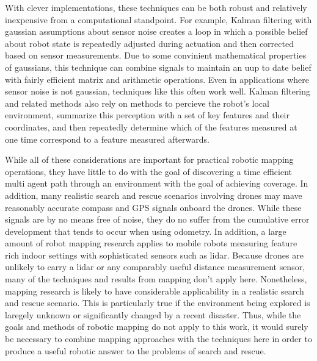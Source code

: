 With clever implementations, these techniques can be both robust and relatively inexpensive from a computational standpoint. For example, Kalman filtering with gaussian assumptions about sensor noise creates a loop in which a possible belief about robot state is repeatedly adjusted during actuation and then corrected based on sensor measurements. Due to some convinient mathematical properties of gaussians, this technique can combine signals to maintain an uup to date belief with fairly efficient matrix and arithmetic operations. Even in applications where sensor noise is not gaussian, techniques like this often work well. Kalman filtering and related methods also rely on methods to percieve the robot's local environment, summarize this perception with a set of key features and their coordinates, and then repeatedly determine which of the features measured at one time correspond to a feature measured afterwards.

While all of these considerations are important for practical robotic mapping operations, they have little to do with the goal of discovering a time efficient multi agent path through an environment with the goal of achieving coverage. In addition, many realistic search and rescue scenarios involving drones may mave reasonably accurate compass and GPS signals onboard the drones. While these signals are by no means free of noise, they do no suffer from the cumulative error development that tends to occur when using odometry. In addition, a large amount of robot mapping research applies to mobile robots measuring feature rich indoor settings with sophisticated sensors such as lidar. Because drones are unlikely to carry a lidar or any comparably useful distance measurement sensor, many of the techniques and results from mapping don't apply here. Nonetheless, mapping research is likely to have considerable applicability in a realistic search and rescue scenario. This is particularly true if the environment being explored is laregely unknown or significantly changed by a recent disaster. Thus, while the goals and methods of robotic mapping do not apply to this work, it would surely be necessary to combine mapping approaches with the techniques here in order to produce a useful robotic answer to the problems of search and rescue.
